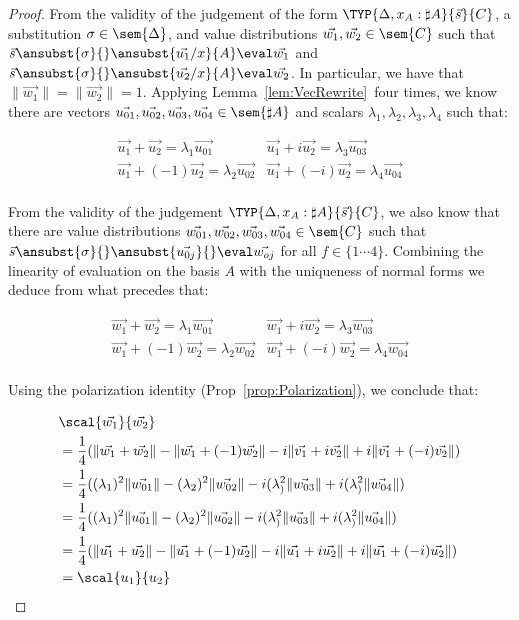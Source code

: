 \begin{proof}
    From the validity of the judgement of the form $\TYP{\Delta, x_A:\sharp A}{\vec{s}}{C}$, a substitution $\sigma\in\sem{\Delta}$, and value distributions $\vec{w_1},\vec{w_2}\in\sem{C}$ such that $\vec{s}\ansubst{\sigma}{}\ansubst{\vec{u_1}/x}{A}\eval\vec{w_1}$ and $\vec{s}\ansubst{\sigma}{}\ansubst{\vec{u_2}/x}{A}\eval\vec{w_2}$. In particular, we have that $\|\vec{w_1}\| = \|\vec{w_2}\|=1$. Applying Lemma~\ref{lem:VecRewrite}~four times, we know there are vectors $\vec{u_{01}},\vec{u_{02}},\vec{u_{03}},\vec{u_{04}}\in\sem{\sharp A}$ and scalars $\lambda_1,\lambda_2,\lambda_3,\lambda_4$ such that:
    
    \begin{align*}
        \vec{u_1} + \vec{u_2} = \lambda_1 \vec{u_{01}} & \vec{u_1} + i \vec{u_2} = \lambda_3 \vec{u_{03}} \\
        \vec{u_1} + (-1) \vec{u_2} = \lambda_2 \vec{u_{02}} & \vec{u_1} + (-i) \vec{u_2} = \lambda_4 \vec{u_{04}} \\
    \end{align*}

    From the validity of the judgement  $\TYP{\Delta, x_A:\sharp A}{\vec{s}}{C}$, we also know that there are value distributions $\vec{w_{01}},\vec{w_{02}},\vec{w_{03}},\vec{w_{04}}\in\sem{C}$ such that $\vec{s}\ansubst{\sigma}{}\ansubst{\vec{u_{0j}}}{}\eval\vec{w_{oj}}$ for all $f\in\{1\dotsb 4\}$. Combining the linearity of evaluation on the basis $A$ with the uniqueness of normal forms we deduce from what precedes that:

    \begin{align*}
        \vec{w_1} + \vec{w_2} = \lambda_1 \vec{w_{01}} & \vec{w_1} + i \vec{w_2} = \lambda_3 \vec{w_{03}} \\
        \vec{w_1} + (-1) \vec{w_2} = \lambda_2 \vec{w_{02}} & \vec{w_1} + (-i) \vec{w_2} = \lambda_4 \vec{w_{04}} \\
    \end{align*}

    Using the polarization identity (Prop~\ref{prop:Polarization}), we conclude that:

    \begin{align*}
        &\scal{\vec{w_1}}{\vec{w_2}}\\
        &= \frac{1}{4}(\|\vec{w_1}+\vec{w_2}\| - \|\vec{w_1} + (-1)\vec{w_2}\| - i \|\vec{v_1} + i \vec{v_2}\| + i \|\vec{v_1} + (-i) \vec{v_2}\|)\\
        &= \frac{1}{4}((\lambda_1)^2\|\vec{w_{01}}\| - (\lambda_2)^2\|\vec{w_{02}}\| - i (\lambda_)^2 \|\vec{w_{03}}\| + i (\lambda_)^2\|\vec{w_{04}}\|)\\
        &= \frac{1}{4}((\lambda_1)^2\|\vec{u_{01}}\| - (\lambda_2)^2\|\vec{u_{02}}\| - i (\lambda_)^2 \|\vec{u_{03}}\| + i (\lambda_)^2\|\vec{u_{04}}\|)\\
        &= \frac{1}{4}(\|\vec{u_1}+\vec{u_2}\| - \|\vec{u_1} + (-1)\vec{u_2}\| - i \|\vec{u_1} + i \vec{u_2}\| + i \|\vec{u_1} + (-i) \vec{u_2}\|)\\
        &=\scal{u_1}{u_2}
    \end{align*}

\end{proof}

